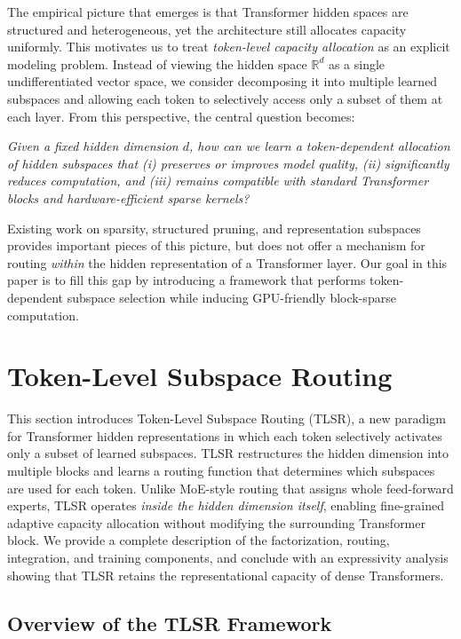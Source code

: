 \documentclass{article}
\theoremstyle{plain}
\theoremstyle{definition}
\theoremstyle{remark}
\begin{document}
The empirical picture that emerges is that Transformer hidden spaces are
structured and heterogeneous, yet the architecture still allocates capacity
uniformly.
This motivates us to treat \emph{token-level capacity allocation} as an
explicit modeling problem.
Instead of viewing the hidden space $\mathbb{R}^d$ as a single undifferentiated
vector space, we consider decomposing it into multiple learned subspaces and
allowing each token to selectively access only a subset of them at each
layer.
From this perspective, the central question becomes:

\emph{Given a fixed hidden dimension $d$, how can we learn a token-dependent
allocation of hidden subspaces that (i) preserves or improves model quality,
(ii) significantly reduces computation, and (iii) remains compatible with
standard Transformer blocks and hardware-efficient sparse kernels?}

Existing work on sparsity, structured pruning, and representation
subspaces~\citep{farina2024sparsitysurvey,mickus2022muppet,huang2025ndm,csreft2025representation,yu2023gpusqtlm,shen2024hardwareaware}
provides important pieces of this picture, but does not offer a mechanism for
routing \emph{within} the hidden representation of a Transformer layer.
Our goal in this paper is to fill this gap by introducing a framework that
performs token-dependent subspace selection while inducing GPU-friendly
block-sparse computation.


\section{Token-Level Subspace Routing}

This section introduces Token-Level Subspace Routing (TLSR), a new paradigm
for Transformer hidden representations in which each token selectively
activates only a subset of learned subspaces.
TLSR restructures the hidden dimension into multiple blocks and learns a
routing function that determines which subspaces are used for each token.
Unlike MoE-style routing that assigns whole feed-forward experts,
TLSR operates \emph{inside the hidden dimension itself}, enabling
fine-grained adaptive capacity allocation without modifying the
surrounding Transformer block.
We provide a complete description of the factorization,
routing, integration, and training components, and conclude with an
expressivity analysis showing that TLSR retains the representational
capacity of dense Transformers.

\subsection{Overview of the TLSR Framework}
\end{document}
